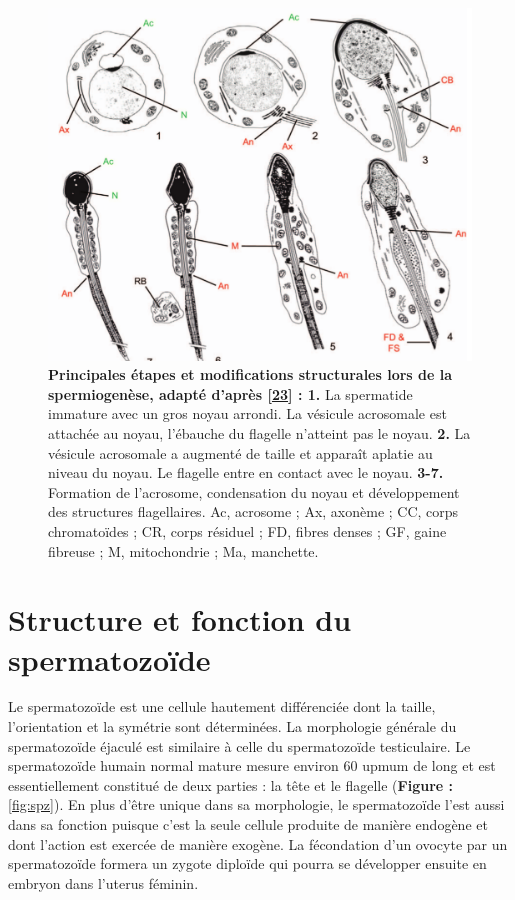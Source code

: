 \documentclass[12pt,twoside]{ugathesis}
\theoremstyle{definition}
\theoremstyle{definition}
\theoremstyle{remark}
\begin{document}
\begin{figure}

{\centering \includegraphics[scale=0.3]{figure/spermiogenese} 

}

\caption[Les différentes étapes de la deuxième division méiotique masculine adapté]{\textbf{Principales étapes et modifications
structurales lors de la spermiogenèse, adapté d'après
{[}\protect\hyperlink{ref-Toure2011}{23}{]} : 1.} La spermatide immature
avec un gros noyau arrondi. La vésicule acrosomale est attachée au
noyau, l'ébauche du flagelle n'atteint pas le noyau. \textbf{2.} La
vésicule acrosomale a augmenté de taille et apparaît aplatie au niveau
du noyau. Le flagelle entre en contact avec le noyau. \textbf{3-7.}
Formation de l'acrosome, condensation du noyau et développement des
structures flagellaires. Ac, acrosome ; Ax, axonème ; CC, corps
chromatoïdes ; CR, corps résiduel ; FD, fibres denses ; GF, gaine
fibreuse ; M, mitochondrie ; Ma, manchette.}\label{fig:spermiogenese}
\end{figure}

\newpage  

\section{Structure et fonction du
spermatozoïde}\label{structure-et-fonction-du-spermatozoide}

Le spermatozoïde est une cellule hautement différenciée dont la taille,
l'orientation et la symétrie sont déterminées. La morphologie générale
du spermatozoïde éjaculé est similaire à celle du spermatozoïde
testiculaire. Le spermatozoïde humain normal mature mesure environ 60
upmum de long et est essentiellement constitué de deux parties : la tête
et le flagelle (\textbf{Figure : }\ref{fig:spz}). En plus d'être unique
dans sa morphologie, le spermatozoïde l'est aussi dans sa fonction
puisque c'est la seule cellule produite de manière endogène et dont
l'action est exercée de manière exogène. La fécondation d'un ovocyte par
un spermatozoïde formera un zygote diploïde qui pourra se développer
ensuite en embryon dans l'uterus féminin.
\end{document}

